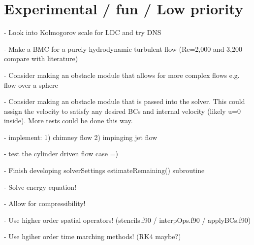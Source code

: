 \documentclass[11pt]{article}
\begin{document}
\section{Experimental / fun / Low priority}
- Look into Kolmogorov scale for LDC and try DNS

- Make a BMC for a purely hydrodynamic turbulent flow (Re=2,000 and 3,200 compare with literature)

- Consider making an obstacle module that allows for more complex flows
e.g. flow over a sphere

- Consider making an obstacle module that is passed into the solver.
This could assign the velocity to satisfy any desired BCs and internal
velocity (likely u=0 inside). More tests could be done this way.

- implement: 1) chimney flow 2) impinging jet flow

- test the cylinder driven flow case =)

- Finish developing solverSettings estimateRemaining() subroutine

- Solve energy equation!

- Allow for compressibility!

- Use higher order spatial operators! (stencils.f90 / interpOps.f90 / applyBCs.f90)

- Use hgiher order time marching methods! (RK4 maybe?)
\end{document}

